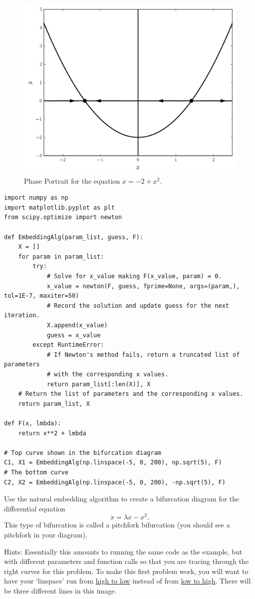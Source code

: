 \begin{figure}
\centering
\includegraphics[width=\textwidth]{SaddleNPhasePortrait.pdf}
\caption{Phase Portrait for the equation $\dot{x} = -2 + x^2$.}
\label{phaseportrait:sn}
\end{figure}

\begin{lstlisting}
import numpy as np
import matplotlib.pyplot as plt
from scipy.optimize import newton

def EmbeddingAlg(param_list, guess, F):
    X = []
    for param in param_list:
        try:
            # Solve for x_value making F(x_value, param) = 0.
            x_value = newton(F, guess, fprime=None, args=(param,), tol=1E-7, maxiter=50)
            # Record the solution and update guess for the next iteration.
            X.append(x_value)
            guess = x_value
        except RuntimeError:
            # If Newton's method fails, return a truncated list of parameters
            # with the corresponding x values.
            return param_list[:len(X)], X
    # Return the list of parameters and the corresponding x values.
    return param_list, X

def F(x, lmbda):
    return x**2 + lmbda

# Top curve shown in the bifurcation diagram
C1, X1 = EmbeddingAlg(np.linspace(-5, 0, 200), np.sqrt(5), F)
# The bottom curve
C2, X2 = EmbeddingAlg(np.linspace(-5, 0, 200), -np.sqrt(5), F)
\end{lstlisting}

\begin{problem}
Use the natural embedding algorithm to create a bifurcation diagram for the differential equation
\[\dot{x} = \lambda x-x^3.\]
This type of bifurcation is called a pitchfork bifurcation (you should see a pitchfork in your diagram).

Hints: Essentially this amounts to running the same code as the example, but with different parameters and function calls so that you are tracing through the right curves for this problem.
To make this first problem work, you will want to have your `linspace' run from \underline{high to low} instead of from \underline{low to high}.
There will be three different lines in this image.
\end{problem}

